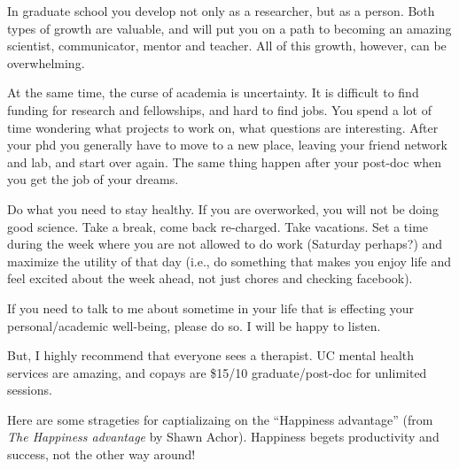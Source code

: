 \documentclass[12pt]{article}
\begin{document}
In graduate school you develop not only as a researcher, but as a
person. Both types of growth are valuable, and will put you on a path
to becoming an amazing scientist, communicator, mentor and
teacher. All of this growth, however, can be overwhelming.

At the same time, the curse of academia is uncertainty. It is
difficult to find funding for research and fellowships, and hard to
find jobs. You spend a lot of time wondering what projects to work on,
what questions are interesting. After your phd you generally have to
move to a new place, leaving your friend network and lab, and start
over again. The same thing happen after your post-doc when you get the
job of your dreams.

Do what you need to stay healthy. If you are overworked, you will not
be doing good science. Take a break, come back re-charged. Take
vacations. Set a time during the week where you are not allowed to do
work (Saturday perhaps?) and maximize the utility of that day (i.e.,
do something that makes you enjoy life and feel excited about the week
ahead, not just chores and checking facebook).

If you need to talk to me about sometime in your life that is effecting
your personal/academic well-being, please do so. I will be happy to
listen. 

But, I highly recommend that everyone sees a therapist. UC mental
health services are amazing, and copays are \$15/10 graduate/post-doc
for unlimited sessions.

Here are some strageties for captializaing on the ``Happiness
advantage'' (from \textit{The Happiness advantage} by Shawn
Achor). Happiness begets productivity and success, not the other way
around!
\end{document}
